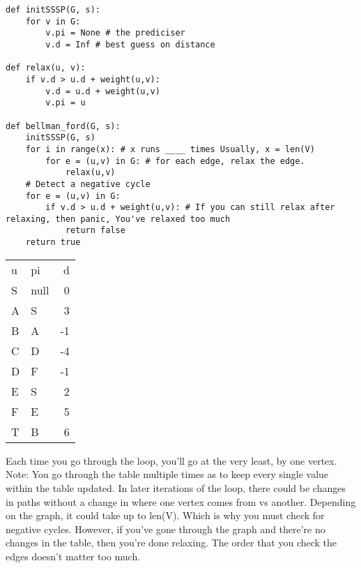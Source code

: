 \documentclass{article}
\begin{document}
\begin{verbatim}
def initSSSP(G, s):
    for v in G:
        v.pi = None # the prediciser
        v.d = Inf # best guess on distance

def relax(u, v):
    if v.d > u.d + weight(u,v):
        v.d = u.d + weight(u,v)
        v.pi = u

def bellman_ford(G, s):
    initSSSP(G, s)
    for i in range(x): # x runs ____ times Usually, x = len(V)
        for e = (u,v) in G: # for each edge, relax the edge.
            relax(u,v)
    # Detect a negative cycle
    for e = (u,v) in G:
        if v.d > u.d + weight(u,v): # If you can still relax after relaxing, then panic, You've relaxed too much
            return false
    return true
\end{verbatim}

\begin{center}
\begin{tabular}{llr}
u & pi & d\\
S & null & 0\\
A & S & 3\\
B & A & -1\\
C & D & -4\\
D & F & -1\\
E & S & 2\\
F & E & 5\\
T & B & 6\\
\end{tabular}
\end{center}

Each time you go through the loop, you'll go at the very least, by one vertex. Note: You go through the table multiple times as to keep every single value within the table updated. In later iterations of the loop, there could be changes in paths without a change in where one vertex comes from vs another. Depending on the graph, it could take up to len(V). Which is why you must check for negative cycles. However, if you've gone through the graph and there're no changes in the table, then you're done relaxing. The order that you check the edges doesn't matter too much.
\end{document}
